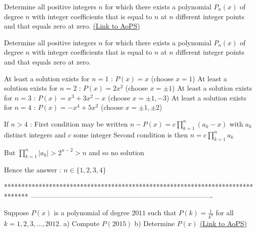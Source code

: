 \begin{problem}
	Determine all positive integers $n$ for which there exists a polynomial $P_n(x)$ of degree $n$ with integer coefficients that is equal to $n$ at $n$ different integer points and that equals zero at zero.
	\flushright \href{https://artofproblemsolving.com/community/c6h386087}{(Link to AoPS)}
\end{problem}



\begin{solution}
	\begin{tcolorbox}Determine all positive integers $n$ for which there exists a polynomial $P_n(x)$ of degree $n$ with integer coefficients that is equal to $n$ at $n$ different integer points and that equals zero at zero.\end{tcolorbox}
At least a solution exists for $n=1$ : $P(x)=x$ (choose $x=1$)
At least a solution exists for $n=2$ : $P(x)=2x^2$ (choose $x=\pm 1$)
At least a solution exists for $n=3$ : $P(x)=x^3+3x^2-x$ (choose $x=\pm 1,-3$)
At least a solution exists for $n=4$ : $P(x)=-x^4+5x^2$ (choose $x=\pm 1,\pm 2$)

If $n>4$ :
First condition may be written $n-P(x)=c\prod_{k=1}^n(a_k-x)$ with $a_k$ distinct integers and $c$ some integer
Second condition is then $n=c\prod_{k=1}^na_k$

But $\prod_{k=1}^n|a_k|>2^{n-2}> n$ and so no solution

Hence the answer : $\boxed{n\in\{1,2,3,4\}}$
\end{solution}
*******************************************************************************
-------------------------------------------------------------------------------

\begin{problem}
	Suppose $P(x)$ is a polynomial of degree $2011$ such that $P(k)=\frac{1}{k^3}$ for all $k=1,2,3,\ldots,2012$.
a) Compute $P(2015)$
b) Determine $P(x)$
	\flushright \href{https://artofproblemsolving.com/community/c6h388353}{(Link to AoPS)}
\end{problem}




